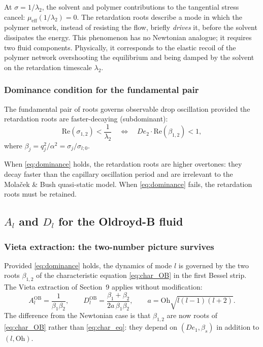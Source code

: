 \begin{notebox}
At $\sigma = 1/\lambda_2$, the solvent and polymer contributions to the
tangential stress cancel: $\mu_{\mathrm{eff}}(1/\lambda_2) = 0$. The
retardation roots describe a mode in which the polymer network, instead of
resisting the flow, briefly \emph{drives} it, before the solvent dissipates
the energy. This phenomenon has no Newtonian analogue; it requires two fluid components. Physically, it corresponds to the elastic recoil
of the polymer network overshooting the equilibrium and being damped by the
solvent on the retardation timescale $\lambda_2$.
\end{notebox}

\subsubsection{Dominance condition for the fundamental pair}

The fundamental pair of roots governs observable drop oscillation provided
the retardation roots are faster-decaying (subdominant):
\begin{equation}
  \mathrm{Re}(\sigma_{1,2}) < \frac{1}{\lambda_2}
  \quad\Longleftrightarrow\quad
  De_2\cdot\mathrm{Re}(\beta_{1,2}) < 1,
  \label{eq:dominance}
\end{equation}
where $\beta_{j} = q_j^2/\alpha^2 = \sigma_j/\sigma_{l;0}$.

When \eqref{eq:dominance} holds, the retardation roots are higher overtones:
they decay faster than the capillary oscillation period and are irrelevant to
the Mola\v{c}ek \& Bush quasi-static model. When \eqref{eq:dominance} fails,
the retardation roots must be retained.

\subsection{$A_l$ and $D_l$ for the Oldroyd-B fluid}

\subsubsection{Vieta extraction: the two-number picture survives}

Provided \eqref{eq:dominance} holds, the dynamics of mode $l$ is governed by
the two roots $\beta_{1,2}$ of the characteristic equation \eqref{eq:char_OB}
in the first Bessel strip. The Vieta extraction of Section~9 applies without
modification:
\begin{equation}
  A_l^{\mathrm{OB}} = \frac{1}{\beta_1\beta_2},
  \qquad
  D_l^{\mathrm{OB}} = \frac{\beta_1 + \beta_2}{2a\,\beta_1\beta_2},
  \qquad
  a = \mathrm{Oh}\sqrt{l(l-1)(l+2)}.
  \label{eq:AD_OB}
\end{equation}
The difference from the Newtonian case is that $\beta_{1,2}$ are now roots
of \eqref{eq:char_OB} rather than \eqref{eq:char_eq}: they depend on
$(De_1, \beta_s)$ in addition to $(l, \mathrm{Oh})$.

